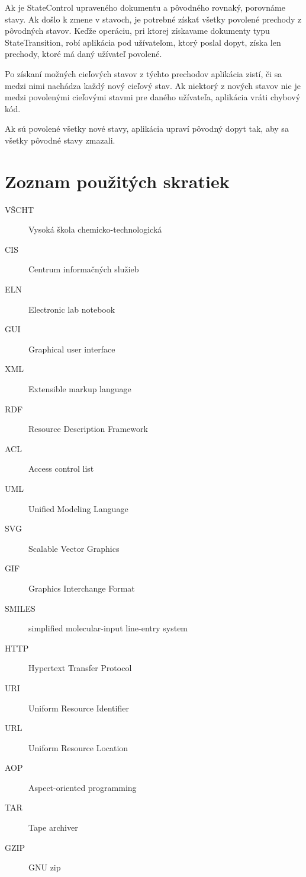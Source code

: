 \documentclass[thesis=M,slovak]{FITthesis}[2013/05/06]
\begin{document}
Ak je StateControl upraveného dokumentu a pôvodného rovnaký, porovnáme stavy. Ak došlo k zmene v stavoch, je potrebné získať všetky povolené prechody z pôvodných stavov. Keďže operáciu, pri ktorej získavame dokumenty typu StateTransition, robí aplikácia pod užívateľom, ktorý poslal dopyt, získa len prechody, ktoré má daný užívateľ povolené.

Po získaní možných cieľových stavov z týchto prechodov aplikácia zistí, či sa medzi nimi nachádza každý nový cieľový stav. Ak niektorý z nových stavov nie je medzi povolenými cieľovými stavmi pre daného užívateľa, aplikácia vráti chybový kód.

Ak sú povolené všetky nové stavy, aplikácia upraví pôvodný dopyt tak, aby sa všetky pôvodné stavy zmazali.

\begin{conclusion}
\end{conclusion}




\appendix

\chapter{Zoznam použitých skratiek}
\begin{description}
	\item[VŠCHT] Vysoká škola chemicko-technologická
	\item[CIS] Centrum informačných služieb
	\item[ELN] Electronic lab notebook
	\item[GUI] Graphical user interface
	\item[XML] Extensible markup language
	\item[RDF] Resource Description Framework
	\item[ACL] Access control list
	\item[UML] Unified Modeling Language
	\item[SVG] Scalable Vector Graphics
	\item[GIF] Graphics Interchange Format
	\item[SMILES] simplified molecular-input line-entry system
	\item[HTTP] Hypertext Transfer Protocol
	\item[URI] Uniform Resource Identifier
	\item[URL] Uniform Resource Location
	\item[AOP] Aspect-oriented programming
	\item[TAR] Tape archiver
	\item[GZIP] GNU zip
\end{description}
\end{document}
